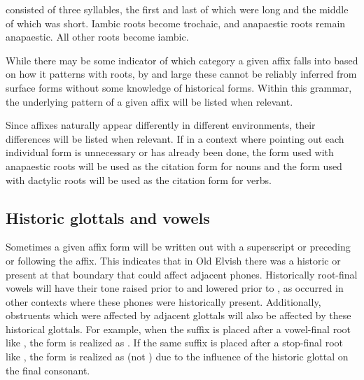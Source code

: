 \begin{description}[rightmargin=30pt, labelindent=30pt, labelwidth=0em, leftmargin=!]
\begin{center}
    \end{center}
    \item[Cretic:] consisted of three syllables, the first and last of which were long and the middle of which was short. Iambic roots become trochaic, and anapaestic roots remain anapaestic. All other roots become iambic.
    \begin{center}
    \end{center} 
\end{description}
While there may be some indicator of which category a given affix falls into based on how it patterns with roots, by and large these cannot be reliably inferred from surface forms without some knowledge of historical forms. Within this grammar, the underlying pattern of a given affix will be listed when relevant. 

Since affixes naturally appear differently in different environments, their differences will be listed when relevant. If in a context where pointing out each individual form is unnecessary or has already been done, the form used with anapaestic roots will be used as the citation form for nouns and the form used with dactylic roots will be used as the citation form for verbs.

\subsection{Historic glottals and vowels}

Sometimes a given affix form will be written out with a superscript \supho{} or \supglot{} preceding or following the affix. This indicates that in Old Elvish there was a historic  or \proto{\glotstop} present at that boundary that could affect adjacent phones. Historically root-final vowels will have their tone raised prior to \supglot{} and lowered prior to \suph{}, as occurred in other contexts where these phones were historically present. Additionally, obstruents which were affected by adjacent glottals will also be affected by these historical glottals. For example, when the suffix  is placed after a vowel-final root like , the form is realized as . If the same suffix is placed after a stop-final root like , the form is realized as  (not ) due to the influence of the historic glottal on the final consonant.

